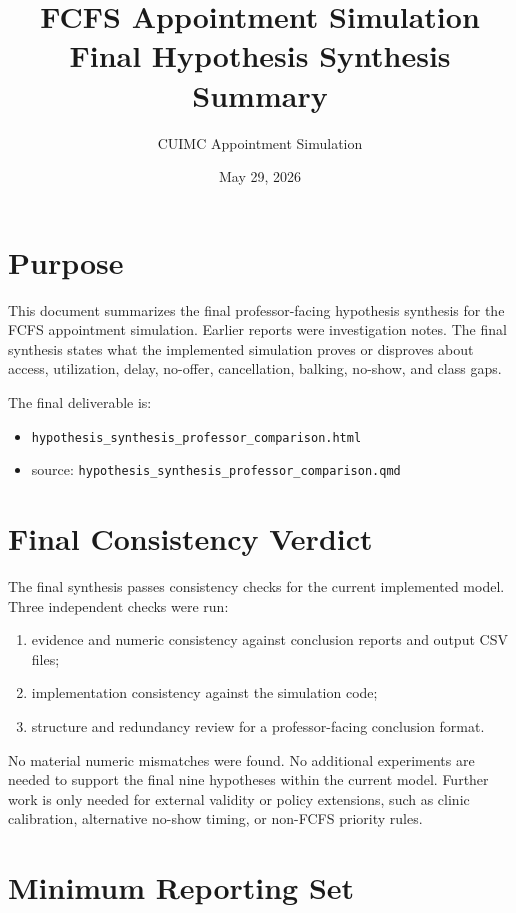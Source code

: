 \documentclass[11pt]{article}
\title{FCFS Appointment Simulation\\Final Hypothesis Synthesis Summary}
\author{CUIMC Appointment Simulation}
\date{May 29, 2026}
\begin{document}
\maketitle

\section*{Purpose}

This document summarizes the final professor-facing hypothesis synthesis for
the FCFS appointment simulation. Earlier reports were investigation notes. The
final synthesis states what the implemented simulation proves or disproves about
access, utilization, delay, no-offer, cancellation, balking, no-show, and class
gaps.

The final deliverable is:

\begin{itemize}
  \item \texttt{hypothesis\_synthesis\_professor\_comparison.html}
  \item source: \texttt{hypothesis\_synthesis\_professor\_comparison.qmd}
\end{itemize}

\section*{Final Consistency Verdict}

The final synthesis passes consistency checks for the current implemented
model. Three independent checks were run:

\begin{enumerate}
  \item evidence and numeric consistency against conclusion reports and output
        CSV files;
  \item implementation consistency against the simulation code;
  \item structure and redundancy review for a professor-facing conclusion
        format.
\end{enumerate}

No material numeric mismatches were found. No additional experiments are needed
to support the final nine hypotheses within the current model. Further work is
only needed for external validity or policy extensions, such as clinic
calibration, alternative no-show timing, or non-FCFS priority rules.

\section*{Minimum Reporting Set}
\end{document}
